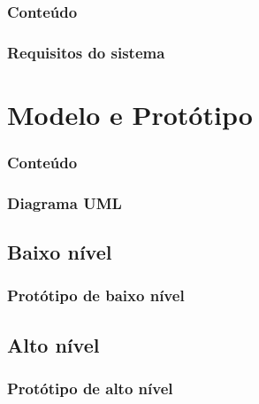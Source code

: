 \documentclass[14pt,beamer]{beamer}
\begin{document}
\begin{frame}
	\frametitle{Conteúdo}
	\small
\end{frame}

\begin{frame}
	\frametitle{Requisitos do sistema}
\end{frame}

\section{Modelo e Protótipo}

\begin{frame}
	\frametitle{Conteúdo}
	\footnotesize
\end{frame}

\begin{frame}
	\frametitle{Diagrama UML}

\end{frame}

\subsection{Baixo nível}
\begin{frame}
	\frametitle{Protótipo de baixo nível}

\end{frame}

\subsection{Alto nível}
\begin{frame}
	\frametitle{Protótipo de alto nível}

\end{frame}

\end{document}
